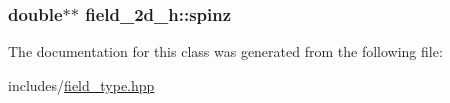 \subsubsection[{\texorpdfstring{spinz}{spinz}}]{\setlength{\rightskip}{0pt plus 5cm}double$\ast$$\ast$ field\+\_\+2d\+\_\+h\+::spinz\hspace{0.3cm}{\ttfamily [protected]}}\hypertarget{classfield__2d__h_a370ec3121a04ddf7e17f95540bbe5517}{}\label{classfield__2d__h_a370ec3121a04ddf7e17f95540bbe5517}


The documentation for this class was generated from the following file\+:\begin{DoxyCompactItemize}
\item 
includes/\hyperlink{field__type_8hpp}{field\+\_\+type.\+hpp}\end{DoxyCompactItemize}
